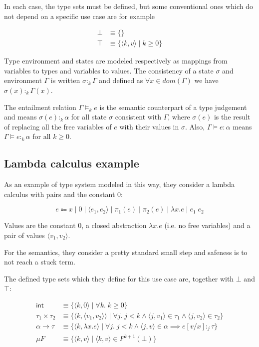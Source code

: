 \documentclass{article}
\begin{document}
In each case, the type sets must be defined, but some conventional 
ones which do not depend on a specific use case are for example 

\begin{align*}
  \bot &\equiv \{\} \\ 
  \top &\equiv \{ \langle k, v \rangle\;|\; k \geq 0 \}
\end{align*}

Type environment and states are modeled respectively as mappings 
from variables to types and variables to values. The consistency 
of a state $\sigma$ and environment $\Gamma$ is written 
$\sigma :_k \Gamma$ and defined as $\forall x \in dom(\Gamma)$
we have $\sigma(x) :_k \Gamma(x)$.

The entailment relation $\Gamma \models_k e$ is the semantic 
counterpart of a type judgement and means 
$\sigma(e):_k \alpha$ for all state $\sigma$ consistent with 
$\Gamma$, where $\sigma(e)$ is the result of replacing all the 
free variables of $e$ with their values in $\sigma$. Also, 
$\Gamma \models e : \alpha$ means 
$\Gamma \models e :_k \alpha$ for all $k \geq 0$.

\subsection*{Lambda calculus example}

As an example of type system modeled in this way, they consider 
a lambda calculus with pairs and the constant $0$:

$$
  e \Coloneqq x 
      \;|\; 0 
      \;|\; \langle e_1, e_2 \rangle 
      \;|\; \pi_1(e) 
      \;|\; \pi_2(e)
      \;|\; \lambda x. e 
      \;|\; e_1\;e_2
$$

Values are the constant $0$, a closed abstraction 
$\lambda x.e$ (i.e. no free variables) and a pair of values 
$\langle v_1, v_2 \rangle$.

For the semantics, they consider a pretty standard small step and 
safeness is to not reach a stuck term.

The defined type sets which they define for this use case are,
together with $\bot$ and $\top$:

\begin{align*}
  \mathsf{int} &\equiv \{ \langle k, 0 \rangle \;|\; 
    \forall k.\;k \geq 0 \} \\
  \tau_1 \times \tau_2 &\equiv 
    \{ \langle k, \langle v_1, v_2 \rangle \rangle \;|\; 
          \forall j.\;j < k \land
          \langle j, v_1\rangle \in \tau_1  \land 
          \langle j, v_2 \rangle \in \tau_2
    \} \\
  \alpha \rightarrow \tau &\equiv 
    \{ \langle k, \lambda x. e \rangle \;|\; 
        \forall j.\;j < k \land
        \langle j, v \rangle \in \alpha \implies
          e[v/x] :_j \tau
    \} \\ 
  \mu F &\equiv 
    \{ \langle k, v \rangle \;|\; \langle k, v \rangle \in 
      F^{k + 1}(\bot)
    \}
\end{align*}
\end{document}
